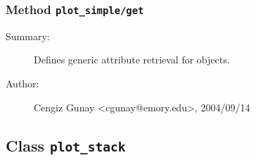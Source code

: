 \subsubsection[Method \texttt{get}]{Method \texttt{plot\_simple/get}}%
%
\label{ref_plot_simple__get}%
\hypertarget{ref_plot_simple__get}{}%
\begin{description}
\item[Summary:]Defines generic attribute retrieval for objects.
%
%
%
%
%
%
%
\item[Author:]%
Cengiz Gunay <cgunay@emory.edu>, 2004/09/14%
\end{description}
\methodline%
\subsection{Class \texttt{plot\_stack}}%
%
\label{ref_plot_stack}%
\hypertarget{ref_plot_stack}{}%

